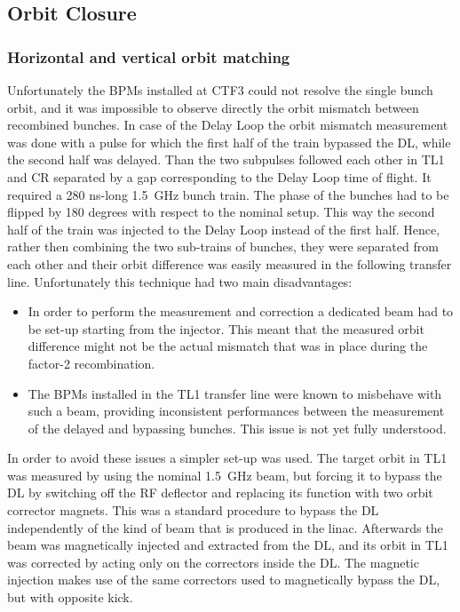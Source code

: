 \subsection{Orbit Closure \label{sec:03_OrbitClosure}}



\subsubsection{Horizontal and vertical orbit matching}
%

Unfortunately the BPMs installed at CTF3 could not resolve the single bunch orbit, 
and it was impossible to observe directly the orbit mismatch between recombined bunches.
In case of the Delay Loop the orbit mismatch measurement was done with a pulse 
for which the first half of the train bypassed the DL, while the second half was delayed.
Than the two subpulses followed each other in TL1 and CR separated by a gap corresponding to 
the Delay Loop time of flight. It required a 280 ns-long 1.5~GHz bunch train.
The phase of the bunches had to be flipped by 180 degrees with respect to the nominal setup.
This way the second half of the train was injected to the Delay Loop instead of the first half. 
Hence, rather then combining the two sub-trains of bunches, they were separated from each other and 
their orbit difference was easily measured in the following transfer line.
Unfortunately this technique had two main disadvantages:
%
\begin{itemize}
\item
In order to perform the measurement and correction a dedicated beam had to be set-up
starting from the injector.
This meant that the measured orbit difference might not be the actual mismatch that was in
place during the factor-2 recombination.
\item
The BPMs installed in the TL1 transfer line were known to misbehave with such a beam,
providing inconsistent performances between the measurement of the delayed and bypassing
bunches. This issue is not yet fully understood.
\end{itemize}
%

In order to avoid these issues a simpler set-up was used.
The target orbit in TL1 was measured by using the nominal 1.5~GHz beam, but forcing it to
bypass the DL by switching off the RF deflector and replacing its function with two orbit corrector magnets.
This was a standard procedure to bypass the DL independently of the kind of beam that is
produced in the linac.
Afterwards the beam was magnetically injected and extracted from the DL, and its orbit in
TL1 was corrected by acting only on the correctors inside the DL. 
The magnetic injection makes use of the same correctors used to magnetically bypass the DL,
but with opposite kick.

